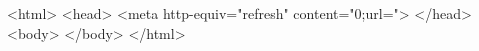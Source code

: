 \begin{ospcode}
<html>
  <head>
    <meta http-equiv="refresh" 
    content="0;url=">
  </head>
  <body>
  </body>
</html>
\end{ospcode}
